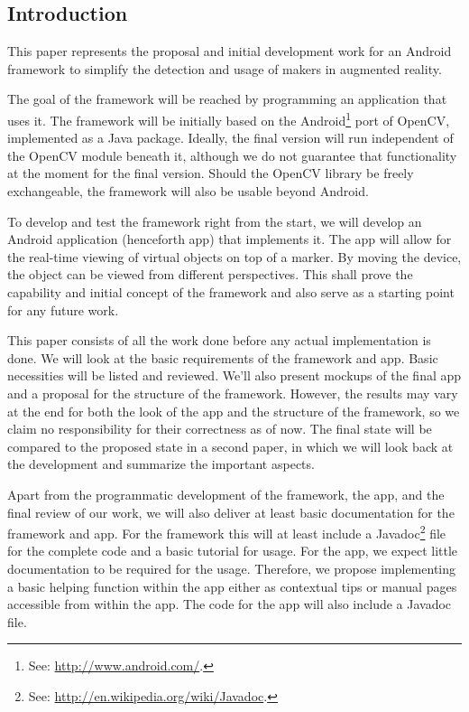 \subsection{Introduction}

This paper represents the proposal and initial development work for an Android framework to simplify the detection and usage of makers in augmented reality.

The goal of the framework will be reached by programming an application that uses it.
The framework will be initially based on the Android\footnote{See: \url{http://www.android.com/}.} port\cite{opencvandroid} of OpenCV\cite{opencv}, implemented as a Java package.
Ideally, the final version will run independent of the OpenCV module beneath it, although we do not guarantee that functionality at the moment for the final version.
Should the OpenCV library be freely exchangeable, the framework will also be usable beyond Android.

To develop and test the framework right from the start, we will develop an Android application (henceforth app) that implements it.
The app will allow for the real-time viewing of virtual objects on top of a marker.
By moving the device, the object can be viewed from different perspectives.
This shall prove the capability and initial concept of the framework and also serve as a starting point for any future work.

This paper consists of all the work done before any actual implementation is done.
We will look at the basic requirements of the framework and app.
Basic necessities will be listed and reviewed.
We'll also present mockups of the final app and a proposal for the structure of the framework.
However, the results may vary at the end for both the look of the app and the structure of the framework, so we claim no responsibility for their correctness as of now.
The final state will be compared to the proposed state in a second paper, in which we will look back at the development and summarize the important aspects.

Apart from the programmatic development of the framework, the app, and the final review of our work, we will also deliver at least basic documentation for the framework and app.
For the framework this will at least include a Javadoc\footnote{See: \url{http://en.wikipedia.org/wiki/Javadoc}.} file for the complete code and a basic tutorial for usage.
For the app, we expect little documentation to be required for the usage.
Therefore, we propose implementing a basic helping function within the app either as contextual tips or manual pages accessible from within the app.
The code for the app will also include a Javadoc file.

